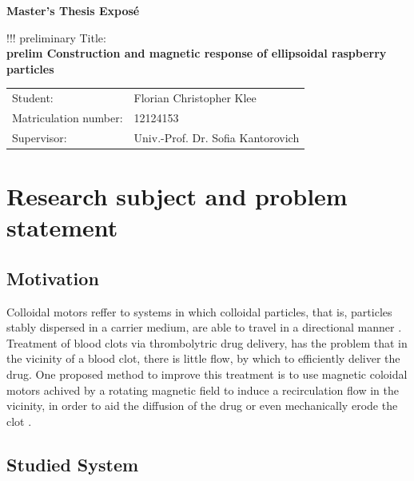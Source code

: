 \documentclass[12pt, DIV=12]{scrartcl}
\renewcommand{\title}{prelim Construction and magnetic response of ellipsoidal raspberry particles} %
\renewcommand{\author}{Florian Christopher Klee}      %
\newcommand{\matrikelnummer}{12124153}      %
\newcommand{\supervisor}{Univ.-Prof. Dr. Sofia Kantorovich}        %
\begin{document}

\begin{center}
    \textbf{Master's Thesis Exposé}
\end{center}

\begin{flushleft}
    \normalsize  !!! preliminary Title: \\[0.2cm]
    \large \textbf{\title} \\[1cm]
\end{flushleft}

\begin{tabular}{@{}ll}
    \normalsize Student:              & \large \author         \\
    \normalsize Matriculation number: & \large \matrikelnummer \\[0.5cm]
    \normalsize Supervisor:           & \large \supervisor
\end{tabular}


\section{Research subject and problem statement}

\subsection{Motivation}

Colloidal motors reffer to systems in which colloidal particles, that is, particles stably dispersed in a carrier medium, are able to travel in a directional manner \cite{Chen2019}.\\
Treatment of blood clots via thrombolytric drug delivery, has the problem that in the vicinity of a blood clot, there is little flow, by which to efficiently deliver the drug. One proposed method to improve this treatment is to use magnetic coloidal motors achived by a rotating magnetic field to induce a recirculation flow in the vicinity, in order to aid the diffusion of the drug or even mechanically erode the clot \cite{Cheng2014}.

\subsection{Studied System}
\end{document}

